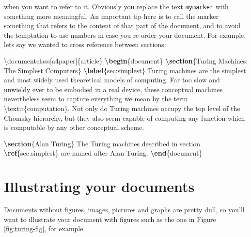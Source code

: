 \documentclass[
]{book}
\newenvironment{Shaded}{\begin{snugshade}}{\end{snugshade}}
\newcommand{\BuiltInTok}[1]{#1}
\newcommand{\ExtensionTok}[1]{#1}
\newcommand{\FunctionTok}[1]{\textcolor[rgb]{0.00,0.00,0.00}{#1}}
\newcommand{\KeywordTok}[1]{\textcolor[rgb]{0.13,0.29,0.53}{\textbf{#1}}}
\newcommand{\NormalTok}[1]{#1}
\begin{document}
when you want to refer to it. Obviously you replace the text \texttt{mymarker} with something more meaningful. An important tip here is to call the marker something that refers to the content of that part of the document, and to avoid the temptation to use numbers in case you re-order your document. For example, lets say we wanted to cross reference between sections:

\begin{Shaded}
\begin{Highlighting}[]
\BuiltInTok{\textbackslash{}documentclass}\NormalTok{[a4paper]\{}\ExtensionTok{article}\NormalTok{\}}
\KeywordTok{\textbackslash{}begin}\NormalTok{\{}\ExtensionTok{document}\NormalTok{\}}
\KeywordTok{\textbackslash{}section}\NormalTok{\{Turing Machines: The Simplest Computers\}}
\KeywordTok{\textbackslash{}label}\NormalTok{\{}\ExtensionTok{sec:simplest}\NormalTok{\}}
\NormalTok{Turing machines are the simplest and most widely used theoretical models of computing. Far too slow and unwieldy ever to be embodied in a real device, these conceptual machines nevertheless seem to capture everything we mean by the term }\FunctionTok{\textbackslash{}textit}\NormalTok{\{computation\}. Not only do Turing machines occupy the top level of the Chomsky hierarchy, but they also seem capable of computing any function which is computable by any other conceptual scheme.}

\KeywordTok{\textbackslash{}section}\NormalTok{\{Alan Turing\}}
\NormalTok{The Turing machines described in section }\KeywordTok{\textbackslash{}ref}\NormalTok{\{}\ExtensionTok{sec:simplest}\NormalTok{\} are named after Alan Turing.}
\KeywordTok{\textbackslash{}end}\NormalTok{\{}\ExtensionTok{document}\NormalTok{\}}
\end{Highlighting}
\end{Shaded}

\hypertarget{illustrating-your-documents}{%
\section{Illustrating your documents}\label{illustrating-your-documents}}

Documents without figures, images, pictures and graphs are pretty dull, so you'll want to illustrate your document with figures such as the one in Figure \ref{fig:turing-fig}, for example.
\end{document}
